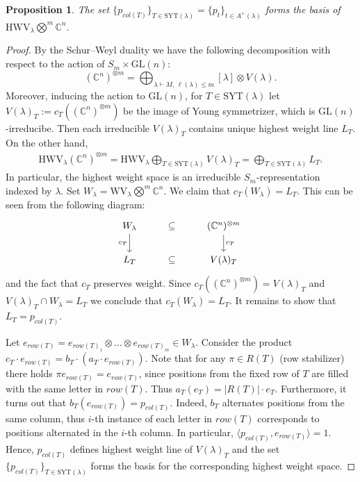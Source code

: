 \documentclass[12pt, reqno]{amsart}
\newtheorem{proposition}[theorem]{Proposition}
\theoremstyle{definition}
\begin{document}
\begin{proposition}\label{th:basis-single}
    The set $\{p_{col(T)}\}_{T \in \mathrm{SYT}(\lambda)} = \{p_{t}\}_{t \in A^+(\lambda)}$ forms the basis of $\mathrm{HWV}_{\lambda} \bigotimes^m \mathbb{C}^n$.
\end{proposition}
\begin{proof}
    By the Schur--Weyl duality we have the following decomposition with respect to the action of $S_m \times \mathrm{GL}(n)$: 
    $$
        (\mathbb{C}^n)^{\otimes m} = \bigoplus_{\lambda \vdash M,\, \ell(\lambda) \le m} [\lambda] \otimes V(\lambda).
    $$
    Moreover, inducing the action to $\mathrm{GL}(n)$, for $T \in \mathrm{SYT}(\lambda)$ let $V(\lambda)_T := c_T((\mathbb{C}^n)^{\otimes m})$ be the image of Young symmetrizer, which is $\mathrm{GL}(n)$-irreducibe. 
    Then each irreducible %
    $V(\lambda)_{T}$ %
    contains unique highest weight line $L_{T}$. On the other hand,
    \begin{align*}
        \mathrm{HWV}_{\lambda}(\mathbb{C}^n)^{\otimes m} =  
        \mathrm{HWV}_{\lambda} \bigoplus_{T \in \mathrm{SYT}(\lambda)} V(\lambda)_T = 
        \bigoplus_{T \in \mathrm{SYT}(\lambda)} L_{T}.
    \end{align*}
    In particular, the highest weight space is an irreducible $S_{m}$-representation indexed by $\lambda$. Set $W_{\lambda} = \mathrm{WV}_{\lambda} \bigotimes^m \mathbb{C}^n$.
    We claim that $c_{T}(W_{\lambda}) = L_{T}$. This can be seen from the following diagram:
    \[\begin{tikzcd}
    W_{\lambda}  \arrow[swap]{d}{c_{T}} & \subseteq & (\mathbb{C}^n)^{\otimes m} \arrow{d}{c_{T}} \\
    L_{T} & \subseteq & V(\lambda)_T
    \end{tikzcd}
    \]
    and the fact that $c_{T}$ preserves weight.
    Since $c_{T}((\mathbb{C}^n)^{\otimes m}) = V(\lambda)_T$ and $V(\lambda)_T \cap W_{\lambda} = L_{T}$ we conclude that $c_{T}(W_{\lambda}) = L_{T}$. It remains to show that $L_T = p_{col(T)}$.

    Let $e_{row(T)} = e_{row(T)_1} \otimes\ldots\otimes e_{row(T)_m} \in W_\lambda$.
    Consider the product $c_{T}\cdot e_{row(T)} = b_{T} \cdot (a_{T} \cdot e_{row(T)})$. Note that for any $\pi \in R(T)$ (row stabilizer) there holds $\pi e_{row(T)} = e_{row(T)}$, since positions from the fixed row of $T$ are filled with the same letter in $row(T)$. Thus $a_{T}(e_{T}) = |R(T)| \cdot e_{T}$. Furthermore,  it turns out that $b_{T}(e_{row(T)}) = p_{col(T)}$. Indeed, $b_T$ alternates positions from the same column, thus $i$-th instance of each letter in $row(T)$ corresponds to positions alternated in the $i$-th column. In particular, $\langle p_{col(T)}, e_{row(T)} \rangle = 1$.
    Hence, $p_{col(T)}$ defines highest weight line of $V(\lambda)_{T}$ and the set $\{p_{col(T)}\}_{T \in \mathrm{SYT}(\lambda)}$ forms the basis for the corresponding highest weight space.
\end{proof}
\end{document}
